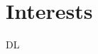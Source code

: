 \documentclass[letterpaper]{twentysecondcv} %
\begin{document}
\sidebartwo %





\section{Interests}


DL





\end{document}
